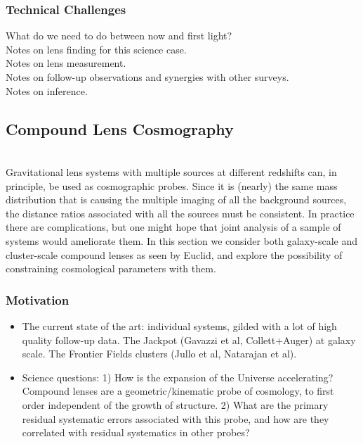 \documentclass[twocolumn]{svjour3}
\begin{document}
\subsubsection{Technical Challenges}

What do we need to do between now and first light?\\

Notes on lens finding for this science case.\\

Notes on lens measurement.\\

Notes on follow-up observations and synergies with other surveys.\\

Notes on inference.\\



\subsection{Compound Lens Cosmography}


\\

Gravitational lens systems with multiple sources at different redshifts can, in principle, be used as cosmographic probes. Since it is (nearly) the same mass distribution that is causing the multiple imaging of all the background sources, the distance ratios associated with all the sources must be consistent. In practice there are complications, but one might hope that joint analysis of a sample of systems would ameliorate them. In this section we consider both galaxy-scale and cluster-scale compound lenses as seen by Euclid, and explore the possibility of constraining cosmological parameters with them.

\subsubsection{Motivation}

\begin{itemize}
\item The current state of the art: individual systems, gilded with a lot of high quality follow-up data. The Jackpot (Gavazzi et al, Collett+Auger) at galaxy scale. The Frontier Fields clusters (Jullo et al, Natarajan et al).
\item Science questions: 1) How is the expansion of the Universe accelerating? Compound lenses are a geometric/kinematic probe of cosmology, to first order independent of the growth of structure. 2) What are the primary residual systematic errors associated with this probe, and how are they correlated with residual systematics in other probes?
\end{itemize}
\end{document}
